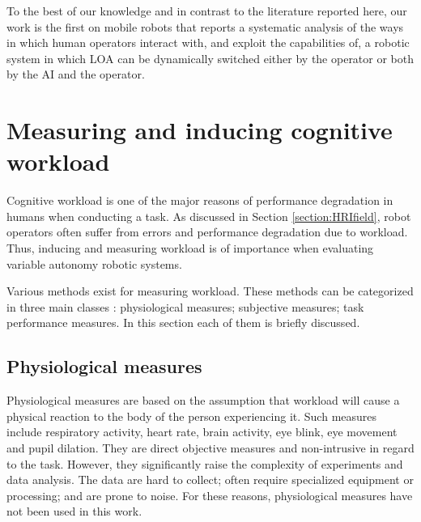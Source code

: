 \documentclass[a4paper,12pt,oneside,openright]{bhamthesis}
\begin{document}
To the best of our knowledge and in contrast to the literature reported here, our work is the first on mobile robots that reports a systematic analysis of the ways in which human operators interact with, and exploit the capabilities of, a robotic system in which LOA can be dynamically switched either by the operator or both by the AI and the operator.

\section{Measuring and inducing cognitive workload}
\label{chapter2:workload}
Cognitive workload is one of the major reasons of performance degradation in humans when conducting a task. As discussed in Section \ref{section:HRIfield}, robot operators often suffer from errors and performance degradation due to workload. Thus, inducing and measuring workload is of importance when evaluating variable autonomy robotic systems.

Various methods exist for measuring workload. These methods can be categorized in three main classes \cite{Farmer2003}: physiological measures; subjective measures; task performance measures. In this section each of them is briefly discussed. 

\subsection{Physiological measures}
Physiological measures are based on the assumption that workload will cause a physical reaction to the body of the person experiencing it. Such measures include respiratory activity, heart rate, brain activity, eye blink, eye movement and pupil dilation. They are direct objective measures and non-intrusive in regard to the task. However, they significantly raise the complexity of experiments and data analysis. The data are hard to collect; often require specialized equipment or processing; and are prone to noise. For these reasons, physiological measures have not been used in this work.
\end{document}
